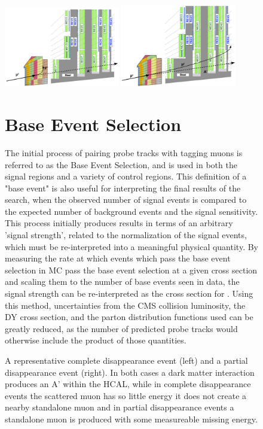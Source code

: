 \begin{figure}[htpb]
	\centering
	\includegraphics[width=0.45\textwidth]{figures/comp_dis.pdf}
	\hspace{0.01\textwidth}
	\includegraphics[width=0.45\textwidth]{figures/part_dis.pdf}
	\caption[Example Complete and Partial Disappearance Events]{A representative complete disappearance event (left) and a partial disappearance event (right). In both cases a dark matter interaction produces an A' within the HCAL, while in complete disappearance events the scattered muon has so little energy it does not create a nearby standalone muon and in partial disappearance events a standalone muon is produced with some measureable missing energy.}

\section{Base Event Selection}
The initial process of pairing probe tracks with tagging muons is referred to as the Base Event Selection, and is used in both the signal regions and a variety of control regions.
This definition of a "base event" is also useful for interpreting the final results of the search, when the observed number of signal events is compared to the expected number of background events and the signal sensitivity.
This process initially produces results in terms of an arbitrary 'signal strength', related to the normalization of the signal events, which must be re-interpreted into a meaningful physical quantity.
By measuring the rate at which events which pass the base event selection in MC pass the base event selection at a given cross section and scaling them to the number of base events seen in data, the signal strength can be re-interpreted as the cross section for \dbrem.
Using this method, uncertainties from the CMS collision luminosity, the DY cross section, and the parton distribution functions used can be greatly reduced, as the number of predicted probe tracks would otherwise include the product of those quantities.


\end{figure}
